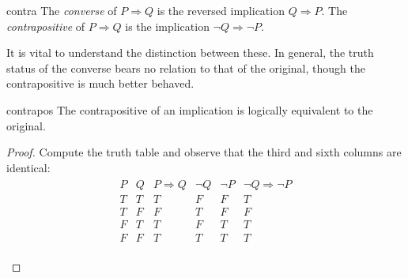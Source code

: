 \goodbreak




\begin{defn}{}{contra}
	The \emph{converse} of $P\Longrightarrow Q$ is the reversed implication $Q\Longrightarrow P$.\smallbreak
	The \emph{contrapositive} of $P\Longrightarrow Q$ is the implication $\neg Q\Longrightarrow\neg P$.
\end{defn}

It is vital to understand the distinction between these. In general, the truth status of the converse bears no relation to that of the original, though the contrapositive is much better behaved.

\begin{thm}{}{contrapos}
	The contrapositive of an implication is logically equivalent to the original.
\end{thm}

\begin{proof}
	Compute the truth table and observe that the third and sixth columns are identical:\footnotemark
	\begin{gather*}
		\begin{array}{cc|c||cc|c}
			P & Q & P\Longrightarrow Q & \neg Q & \neg P & \neg Q\Longrightarrow\neg P\\\hline
			T & T & T & F & F & T\\
			T & F & F & T & F & F\\
			F & T & T & F & T & T\\
			F & F & T & T & T & T
		\end{array}\\[-15pt]
		\phantom{bob}\tag*{\qedhere}
	\end{gather*}
\end{proof}


\vspace{-5pt}


